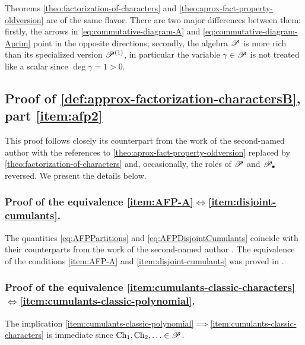 \documentclass[12pt,usenames,dvipsnames,svgnames,table]{amsart}
\begin{document}
Theorems \ref{theo:factorization-of-characters} and \ref{theo:aprox-fact-property-oldversion}
are of the same flavor. There are two major differences between them:
firstly, the arrows in \eqref{eq:commutative-diagram-A} and \eqref{eq:commutative-diagram-Aprim}
point in the opposite directions;
secondly, the algebra $\mathscr{P}$ is more rich than its specialized version $\mathscr{P}^{(1)}$,
in particular the variable $\gamma\in\mathscr{P}$ is not treated like a scalar since 
$\deg \gamma=1 >0$.

\subsection{Proof of \cref{def:approx-factorization-charactersB}, part
	\ref{item:afp2}}
\label{sec:detailed}

This proof follows closely its counterpart from the work of the second-named author
\cite[Theorem and Definition 1]{Sniady2006c}
with the references to \cref{theo:aprox-fact-property-oldversion}
replaced by \cref{theo:factorization-of-characters} and, occasionally,
the roles of $\mathscr{P}$ and $\mathscr{P}_\bullet$ reversed.
We present the details below.

\subsubsection{Proof of the equivalence \ref{item:AFP-A}$\iff$\ref{item:disjoint-cumulants}.}

The quantities \eqref{eq:AFPPartitions} and \eqref{eq:AFPDisjointCumulants}
coincide with their counterparts from the work of the second-named author
\cite[Eqs.~(12) and (13)]{Sniady2006c}.
The equivalence of the conditions \ref{item:AFP-A} and \ref{item:disjoint-cumulants}
was proved in \cite[Section 4.7]{Sniady2006c}.

\subsubsection{Proof of the equivalence \ref{item:cumulants-classic-characters}$\iff$\ref{item:cumulants-classic-polynomial}.}
The implication \ref{item:cumulants-classic-polynomial}$\implies$\ref{item:cumulants-classic-characters}
is immediate since $\operatorname{Ch}_1,\operatorname{Ch}_2,\ldots\in\mathscr{P}$.

\smallskip
\end{document}
